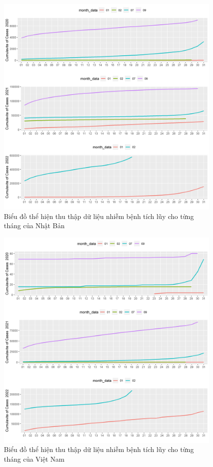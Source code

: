 \documentclass[a4paper]{article}
\theoremstyle{definition}
\begin{document}
\begin{enumerate}[i)]
\begin{enumerate}[1)]
\begin{figure}[htp]
		    \includegraphics[scale = 0.7]{Images/VI/vi7 Japan .jpeg}
		    \caption{Biểu đồ thể hiện thu thập dữ liệu nhiễm bệnh tích lũy cho từng tháng của Nhật Bản}
		    \label{fig:my_label}
		\end{figure}
		\begin{figure}[htp]
		    \centering
		    \includegraphics[scale = 0.7]{Images/VI/vi7 Vietnam .jpeg} 
		    \caption{Biểu đồ thể hiện thu thập dữ liệu nhiễm bệnh tích lũy cho từng tháng của Việt Nam}
		    \label{fig:my_label}
		 \end{figure}
		 \newpage
    

\end{enumerate}
\end{enumerate}
\end{document}
